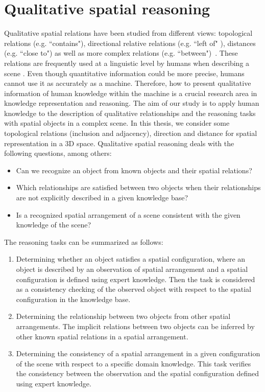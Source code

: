 \documentclass{article}
\begin{document}
\section{Qualitative spatial reasoning}\label{sec:qsr}
Qualitative spatial relations have been studied from different views:
 topological relations (e.g. ``contains"), directional relative relations (e.g. ``left of" ), distances (e.g. ``close to") 
 as well as more complex relations (e.g. ``between")~\cite{Bloch2005fuzzy,freeman1975modelling,Hudelot2008fuzzy,kuipers1978modeling}. 
These relations are frequently used at a linguistic level by humans when describing a scene \cite{freksa1991qualitative}.
Even though quantitative information could be more precise, humans cannot use it as accurately as a machine.
Therefore, how to present qualitative information of human knowledge within the machine is a crucial research area in knowledge representation and reasoning.
The aim of our study is to apply human knowledge to the description of qualitative relationships and the reasoning tasks with spatial objects in a complex scene.
In this thesis, we consider some topological relations (inclusion and adjacency), direction and distance for spatial representation in a 3D space.
Qualitative spatial reasoning deals with the following questions, among others:
 \begin{itemize}
  \item Can we recognize an object from known objects and their spatial relations?
  \item Which relationships are satisfied between two objects when their relationships are not explicitly described in a given  knowledge base?
  \item Is a recognized spatial arrangement of a scene consistent with the given knowledge of the scene?
 \end{itemize}
 
 The reasoning tasks can be summarized as follows:
 \begin{enumerate}
  \item Determining whether an object satisfies a spatial configuration, where an object is described by an observation of spatial arrangement and 
  a spatial configuration is defined using expert knowledge. Then the task is considered as a consistency checking  of the observed object with respect to the spatial configuration in 
  the knowledge base.
  \item Determining the relationship between two objects from other spatial arrangements. The implicit relations between two objects can be inferred by other known spatial relations
  in a spatial arrangement.
  \item Determining the consistency of a spatial arrangement in a given configuration of the scene with respect to a specific domain knowledge. This task verifies the consistency
  between the observation and the spatial configuration defined using expert knowledge.
 \end{enumerate}
\end{document}

